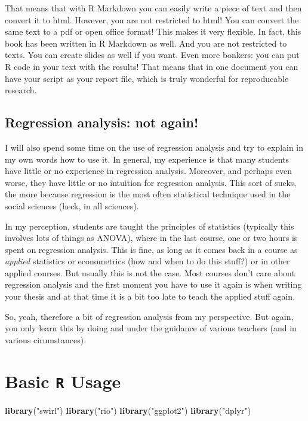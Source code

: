\documentclass[]{article}
\newenvironment{Shaded}{\begin{snugshade}}{\end{snugshade}}
\newcommand{\KeywordTok}[1]{\textcolor[rgb]{0.13,0.29,0.53}{\textbf{#1}}}
\newcommand{\StringTok}[1]{\textcolor[rgb]{0.31,0.60,0.02}{#1}}
\newcommand{\NormalTok}[1]{#1}
\theoremstyle{definition}
\theoremstyle{definition}
\theoremstyle{definition}
\theoremstyle{remark}
\begin{document}
That means that with R Markdown you can easily write a piece of text and
then convert it to html. However, you are not restricted to html! You
can convert the same text to a pdf or open office format! This makes it
very flexible. In fact, this book has been written in R Markdown as
well. And you are not restricted to texts. You can create slides as well
if you want. Even more bonkers: you can put R code in your text with the
results! That means that in one document you can have your script as
your report file, which is truly wonderful for reproducable research.

\subsection{Regression analysis: not
again!}\label{regression-analysis-not-again}

I will also spend some time on the use of regression analysis and try to
explain in my own words how to use it. In general, my experience is that
many students have little or no experience in regression analysis.
Moreover, and perhaps even worse, they have little or no intuition for
regression analysis. This sort of sucks, the more because regression is
the most often statistical technique used in the social sciences (heck,
in all sciences).

In my perception, students are taught the principles of statistics
(typically this involves lots of things as ANOVA), where in the last
course, one or two hours is spent on regression analysis. This is fine,
as long as it comes back in a course as \emph{applied} statistics or
econometrics (how and when to do this stuff?) or in other applied
courses. But usually this is not the case. Most courses don't care about
regression analysis and the first moment you have to use it again is
when writing your thesis and at that time it is a bit too late to teach
the applied stuff again.

So, yeah, therefore a bit of regression analysis from my perspective.
But again, you only learn this by doing and under the guidance of
various teachers (and in various cirumstances).

\section{\texorpdfstring{Basic \texttt{R}
Usage}{Basic R Usage}}\label{basic-r-usage}

\begin{Shaded}
\begin{Highlighting}[]
\KeywordTok{library}\NormalTok{(}\StringTok{"swirl"}\NormalTok{)}
\KeywordTok{library}\NormalTok{(}\StringTok{"rio"}\NormalTok{)}
\KeywordTok{library}\NormalTok{(}\StringTok{"ggplot2"}\NormalTok{)}
\KeywordTok{library}\NormalTok{(}\StringTok{"dplyr"}\NormalTok{)}
\end{Highlighting}
\end{Shaded}
\end{document}
